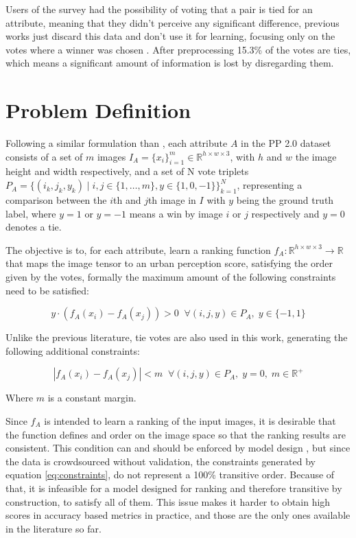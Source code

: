 Users of the survey had the possibility of voting that a pair is tied for an attribute,
meaning that they didn't perceive any significant difference, previous works just
discard this data and don't use it for learning, focusing only on the votes where a winner was
chosen \cite{hidalgo_placepulse,zhang_measuring,tamara_judgments}. After preprocessing 15.3\% of the
votes are ties, which means a significant amount of information is lost by disregarding them.


\section{Problem Definition}
\label{sec:problem_def}

Following a similar formulation than , each attribute $A$ in the PP 2.0 dataset consists of a set
of $m$ images $I_A = \{x_i\}_{i=1}^m \in \mathbb{R}^{h \times w \times 3}$, with $h$ and $w$
the image height and width respectively, and a set of N vote triplets
$P_A=\{(i_k, j_k, y_k) \;|\; i,j \in \{1, \ldots, m \} , y \in \{1,0,-1\}\}_{k=1}^N$, representing a comparison
between the $i$th and $j$th image in $I$ with $y$ being the ground truth label, where $y=1$ or $y=-1$ means a win by image
$i$ or $j$ respectively and  $y=0$ denotes a tie.

The objective is to, for each attribute, learn a ranking function $f_A : \mathbb{R}^{h \times w \times 3} \rightarrow \mathbb{R}$
that maps the image tensor to an urban perception score, satisfying the order given by the votes, formally the
maximum amount of the following constraints need to be satisfied:

\begin{equation}
y \cdot (f_A(x_i) - f_A(x_j)) > 0 \;\; \forall (i,j,y) \in P_A, \; y \in \{-1,1\}
\label{eq:constraints}
\end{equation}

Unlike the previous literature, tie votes are also used in this work, generating the following additional constraints:

\begin{equation}
	|f_A(x_i) - f_A(x_j)| < m \;\; \forall (i,j,y) \in P_A, \; y = 0, \; m \in \mathbb{R}^+
	\label{eq:constraints_ties}
\end{equation}

Where $m$ is a constant margin.

Since $f_A$ is intended to learn a ranking of the input images, it is desirable that the function defines and order
on the image space so that the ranking results are consistent. This condition can and should be enforced by
model design \cite{koppel_pairwise}, but since the data is crowdsourced without
validation, the constraints generated by equation \ref{eq:constraints}, do not represent a  100\% transitive order.
Because of that, it is infeasible for a model designed for ranking and therefore
transitive by construction, to satisfy all of them.
This issue makes it harder to obtain high scores in accuracy based metrics in practice, and
those are the only ones available in the literature so far.

